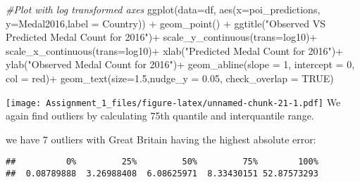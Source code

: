 \documentclass[
]{article}
\newenvironment{Shaded}{\begin{snugshade}}{\end{snugshade}}
\newcommand{\AttributeTok}[1]{\textcolor[rgb]{0.77,0.63,0.00}{#1}}
\newcommand{\CommentTok}[1]{\textcolor[rgb]{0.56,0.35,0.01}{\textit{#1}}}
\newcommand{\ConstantTok}[1]{\textcolor[rgb]{0.00,0.00,0.00}{#1}}
\newcommand{\DecValTok}[1]{\textcolor[rgb]{0.00,0.00,0.81}{#1}}
\newcommand{\FloatTok}[1]{\textcolor[rgb]{0.00,0.00,0.81}{#1}}
\newcommand{\FunctionTok}[1]{\textcolor[rgb]{0.00,0.00,0.00}{#1}}
\newcommand{\NormalTok}[1]{#1}
\newcommand{\SpecialCharTok}[1]{\textcolor[rgb]{0.00,0.00,0.00}{#1}}
\newcommand{\StringTok}[1]{\textcolor[rgb]{0.31,0.60,0.02}{#1}}
\begin{document}
\begin{Shaded}
\begin{Highlighting}[]
\CommentTok{\#Plot with log transformed axes}
\FunctionTok{ggplot}\NormalTok{(}\AttributeTok{data=}\NormalTok{df, }\FunctionTok{aes}\NormalTok{(}\AttributeTok{x=}\NormalTok{poi\_predictions, }\AttributeTok{y=}\NormalTok{Medal2016,}\AttributeTok{label =}\NormalTok{ Country)) }\SpecialCharTok{+}
  \FunctionTok{geom\_point}\NormalTok{() }\SpecialCharTok{+}
  \FunctionTok{ggtitle}\NormalTok{(}\StringTok{"Observed VS Predicted Medal Count for 2016"}\NormalTok{)}\SpecialCharTok{+}
  \FunctionTok{scale\_y\_continuous}\NormalTok{(}\AttributeTok{trans=}\StringTok{\textquotesingle{}log10\textquotesingle{}}\NormalTok{)}\SpecialCharTok{+}
  \FunctionTok{scale\_x\_continuous}\NormalTok{(}\AttributeTok{trans=}\StringTok{\textquotesingle{}log10\textquotesingle{}}\NormalTok{)}\SpecialCharTok{+}
  \FunctionTok{xlab}\NormalTok{(}\StringTok{"Predicted Medal Count for 2016"}\NormalTok{)}\SpecialCharTok{+}
  \FunctionTok{ylab}\NormalTok{(}\StringTok{"Observed Medal Count for 2016"}\NormalTok{)}\SpecialCharTok{+}
  \FunctionTok{geom\_abline}\NormalTok{(}\AttributeTok{slope =} \DecValTok{1}\NormalTok{, }\AttributeTok{intercept =} \DecValTok{0}\NormalTok{, }\AttributeTok{col =} \StringTok{\textquotesingle{}red\textquotesingle{}}\NormalTok{)}\SpecialCharTok{+}
  \FunctionTok{geom\_text}\NormalTok{(}\AttributeTok{size=}\FloatTok{1.5}\NormalTok{,}\AttributeTok{nudge\_y =} \FloatTok{0.05}\NormalTok{,  }\AttributeTok{check\_overlap =} \ConstantTok{TRUE}\NormalTok{)}
\end{Highlighting}
\end{Shaded}

\texttt{[image: Assignment\_1\_files/figure-latex/unnamed-chunk-21-1.pdf]}
We again find outliers by calculating 75th quantile and interquantile
range.

we have 7 outliers with Great Britain having the highest absolute error:

\begin{Shaded}
\end{Shaded}

\begin{verbatim}
##          0%         25%         50%         75%        100% 
##  0.08789888  3.26988408  6.08625971  8.33430151 52.87573293
\end{verbatim}
\end{document}
